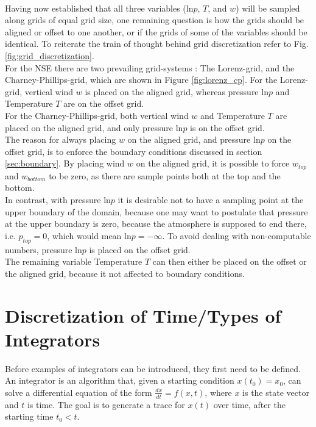 \\
Having now established that all three variables ($\text{ln}p$, $T$, and $w$) will be sampled along grids of equal grid size, one remaining question is how the grids should be aligned or offset to one another, or if the grids of some of the variables should be identical.
To reiterate the train of thought behind grid discretization refer to Fig. \ref{fig:grid_discretization}.\\
For the NSE there are two prevailing grid-systems \cite{holdaway2013comparison}: The Lorenz-grid, and the Charney-Phillips-grid, which are shown in Figure \ref{fig:lorenz_cp}.
For the Lorenz-grid, vertical wind $w$ is placed on the aligned grid, whereas pressure $\text{ln}p$ and Temperature $T$ are on the offset grid.\\
For the Charney-Phillips-grid, both vertical wind $w$ and Temperature $T$ are placed on the aligned grid, and only pressure $\text{ln}p$ is on the offset grid.\\
The reason for always placing $w$ on the aligned grid, and pressure $\text{ln}p$ on the offset grid, is to enforce the boundary conditions discussed in section \ref{sec:boundary}.
By placing wind $w$ on the aligned grid, it is possible to force $w_{top}$ and $w_{bottom}$ to be zero, as there are sample points both at the top and the bottom.\\
In contrast, with pressure $\text{ln}p$ it is desirable not to have a sampling point at the upper boundary of the domain, because one may want to postulate that pressure at the upper boundary is zero, because the atmosphere is supposed to end there, i.e. $p_{top}=0$, which would mean $\text{ln}p = -\infty$.
To avoid dealing with non-computable numbers, pressure $\text{ln}p$ is placed on the offset grid.\\
The remaining variable Temperature $T$ can then either be placed on the offset or the aligned grid, because it not affected to boundary conditions.

\section{Discretization of Time/Types of Integrators}
Before examples of integrators can be introduced, they first need to be defined.
An integrator is an algorithm that, given a starting condition $x(t_0) = x_0$, can solve a differential equation of the form $\frac{dx}{dt} = f(x,t)$, where $x$ is the state vector and $t$ is time.
The goal is to generate a trace for $x(t)$ over time, after the starting time $t_0<t$.

